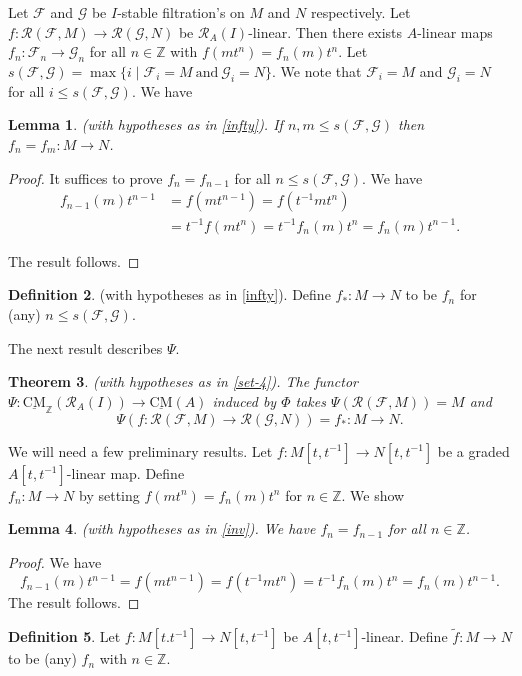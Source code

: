 \documentclass{amsart}
\newcommand{\Z}{\mathbb{Z} }
\newcommand{\eR}{\mathcal{R} }
\newcommand{\Fc}{\mathcal{F} }
\newcommand{\Gc}{\mathcal{G} }
\newcommand{\rt}{\rightarrow}
\newcommand{\wt}{\widetilde }
\newcommand{\CMS}{\operatorname{\underline{CM}}}
\theoremstyle{plain}
\newtheorem{theorem}{Theorem}[section]
\newtheorem{lemma}[theorem]{Lemma}
\theoremstyle{definition}
\newtheorem{definition}[theorem]{Definition}
\theoremstyle{remark}
\begin{document}
{\s \label{infty} Let $\Fc$ and $\Gc$ be $I$-stable filtration's on $M$ and $N$ respectively. Let \\ $f \colon \eR(\Fc, M) \rt \eR(\Gc, N)$ be $\eR_A(I)$-linear. Then there exists $A$-linear maps
\\ $f_n \colon \Fc_n \rt \Gc_n$ for all $n \in \Z$ with $f(mt^n) = f_n(m)t^n$. Let $s(\Fc, \Gc) = \max \{ i \mid \Fc_i = M \ \text{and} \ \Gc_i = N \}$. We note that $\Fc_i = M$ and $\Gc_i = N$ for all $i \leq s(\Fc, \Gc)$. We have
\begin{lemma}\label{f*}
(with hypotheses as in \ref{infty}). If $n, m \leq s(\Fc, \Gc)$ then $f_n = f_m \colon M \rt N$.
\end{lemma}
\begin{proof}
  It suffices to prove $f_n = f_{n-1}$ for all $n \leq s(\Fc, \Gc)$.
  We have
  \begin{align*}
    f_{n-1}(m)t^{n-1} &= f(m t^{n-1}) = f(t^{-1}mt^{n})   \\
     & = t^{-1}f(mt^{n}) = t^{-1}f_n(m)t^{n} = f_n(m)t^{n-1}.
  \end{align*}

  The result follows.
\end{proof}
\begin{definition}
(with hypotheses as in \ref{infty}). Define $f_* \colon M \rt N$ to be $f_n$ for (any) $n \leq s(\Fc, \Gc)$.
\end{definition}
The next result describes $\Psi$.
\begin{theorem}
\label{psi}(with hypotheses as in \ref{set-4}). The functor $\Psi \colon \CMS_\Z(\eR_A(I)) \rt \CMS(A)$ induced by $\Phi$ takes $\Psi(\eR(\Fc, M)) = M$ and
$$\Psi(f \colon \eR(\Fc, M) \rt \eR(\Gc, N)) = f_* \colon M \rt N.$$
\end{theorem}
We will need a few preliminary results.
\s \label{inv} Let $f \colon M[t,t^{-1}] \rt N[t,t^{-1}]$ be a graded  $A[t,t^{-1}]$-linear map. Define \\ $f_n \colon M \rt N$ by setting $f(mt^n) = f_n(m)t^n$ for $n \in \Z$.
We show
\begin{lemma}\label{bella-3}(with hypotheses as in \ref{inv}). We have $f_n = f_{n-1}$ for all $n \in \Z$.
\end{lemma}
\begin{proof}
  We have
  $$f_{n-1}(m)t^{n-1} = f(mt^{n-1}) = f(t^{-1}mt^{n}) = t^{-1}f_n(m)t^{n} = f_n(m)t^{n-1}.$$
  The result follows.
\end{proof}
\begin{definition}
Let $f \colon M[t.t^{-1}] \rt N[t,t^{-1}]$ be $A[t,t^{-1}]$-linear. Define $\wt{f} \colon M \rt N$ to be (any) $f_n$ with $n \in \Z$.
\end{definition}

}
\end{document}
